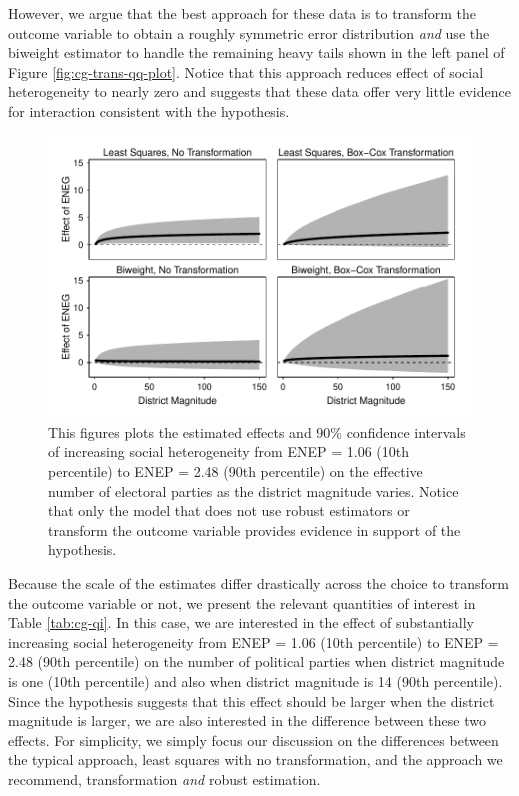 \documentclass[12pt]{article}
\begin{document}
However, we argue that the best approach for these data is to transform the outcome variable to obtain a roughly symmetric error distribution \textit{and} use the biweight estimator to handle the remaining heavy tails shown in the left panel of Figure \ref{fig:cg-trans-qq-plot}. Notice that this approach reduces effect of social heterogeneity to nearly zero and suggests that these data offer very little evidence for interaction consistent with the hypothesis.

\begin{figure}[h!]
\begin{center}
\includegraphics[scale = 0.8]{figs/cg-fd-plots.pdf}
\caption{This figures plots the estimated effects and 90\% confidence intervals of increasing social heterogeneity from ENEP = 1.06 (10th percentile) to ENEP = 2.48 (90th percentile) on the effective number of electoral parties as the district magnitude varies. Notice that only the model that does not use robust estimators or transform the outcome variable provides evidence in support of the hypothesis.}\label{fig:cg-fd-plots}
\end{center}
\end{figure}

Because the scale of the estimates differ drastically across the choice to transform the outcome variable or not, we present the relevant quantities of interest in Table \ref{tab:cg-qi}. In this case, we are interested in the effect of substantially increasing social heterogeneity from ENEP = 1.06 (10th percentile) to ENEP = 2.48 (90th percentile) on the number of political parties when district magnitude is one (10th percentile) and also when district magnitude is 14 (90th percentile). Since the hypothesis suggests that this effect should be larger when the district magnitude is larger, we are also interested in the difference between these two effects. For simplicity, we simply focus our discussion on the differences between the typical approach, least squares with no transformation, and the approach we recommend, transformation \textit{and} robust estimation.
\end{document}
